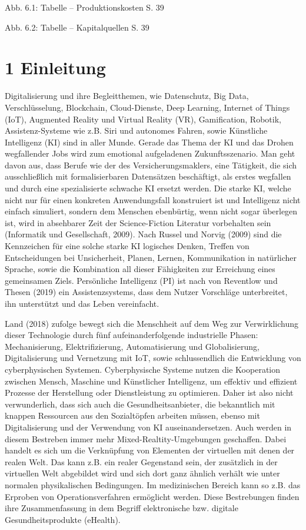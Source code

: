 \documentclass[
  a4paper,
  DIV=11,
  numbers=noendperiod,
  onecolumn,
  oneside,
  a4paper]{scrartcl}
\begin{document}
Abb. 6.1: Tabelle -- Produktionskosten S. 39

Abb. 6.2: Tabelle -- Kapitalquellen S. 39

\section{1 Einleitung}\label{einleitung}

Digitalisierung und ihre Begleitthemen, wie Datenschutz, Big Data,
Verschlüsselung, Blockchain, Cloud-Dienste, Deep Learning, Internet of
Things (IoT), Augmented Reality und Virtual Reality (VR), Gamification,
Robotik, Assistenz-Systeme wie z.B. Siri und autonomes Fahren, sowie
Künstliche Intelligenz (KI) sind in aller Munde. Gerade das Thema der KI
und das Drohen wegfallender Jobs wird zum emotional aufgeladenen
Zukunftsszenario. Man geht davon aus, dass Berufe wie der des
Versicherungsmaklers, eine Tätigkeit, die sich ausschließlich mit
formalisierbaren Datensätzen beschäftigt, als erstes wegfallen und durch
eine spezialisierte schwache KI ersetzt werden. Die starke KI, welche
nicht nur für einen konkreten Anwendungsfall konstruiert ist und
Intelligenz nicht einfach simuliert, sondern dem Menschen ebenbürtig,
wenn nicht sogar überlegen ist, wird in absehbarer Zeit der
Science-Fiction Literatur vorbehalten sein (Informatik und Gesellschaft,
2009). Nach Russel und Norvig (2009) sind die Kennzeichen für eine
solche starke KI logisches Denken, Treffen von Entscheidungen bei
Unsicherheit, Planen, Lernen, Kommunikation in natürlicher Sprache,
sowie die Kombination all dieser Fähigkeiten zur Erreichung eines
gemeinsamen Ziels. Persönliche Intelligenz (PI) ist nach von Reventlow
und Thesen (2019) ein Assistenzsystems, dass dem Nutzer Vorschläge
unterbreitet, ihn unterstützt und das Leben vereinfacht.

Land (2018) zufolge bewegt sich die Menschheit auf dem Weg zur
Verwirklichung dieser Technologie durch fünf aufeinanderfolgende
industrielle Phasen: Mechanisierung, Elektrifizierung, Automatisierung
und Globalisierung, Digitalisierung und Vernetzung mit IoT, sowie
schlussendlich die Entwicklung von cyberphysischen Systemen.
Cyberphysische Systeme nutzen die Kooperation zwischen Mensch, Maschine
und Künstlicher Intelligenz, um effektiv und effizient Prozesse der
Herstellung oder Dienstleistung zu optimieren. Daher ist also nicht
verwunderlich, dass sich auch die Gesundheitsanbieter, die bekanntlich
mit knappen Ressourcen aus den Sozialtöpfen arbeiten müssen, ebenso mit
Digitalisierung und der Verwendung von KI auseinandersetzen. Auch werden
in diesem Bestreben immer mehr Mixed-Realtity-Umgebungen geschaffen.
Dabei handelt es sich um die Verknüpfung von Elementen der virtuellen
mit denen der realen Welt. Das kann z.B. ein realer Gegenstand sein, der
zusätzlich in der virtuellen Welt abgebildet wird und sich dort ganz
ähnlich verhält wie unter normalen physikalischen Bedingungen. Im
medizinischen Bereich kann so z.B. das Erproben von Operationsverfahren
ermöglicht werden. Diese Bestrebungen finden ihre Zusammenfassung in dem
Begriff elektronische bzw. digitale Gesundheitsprodukte (eHealth).
\end{document}
